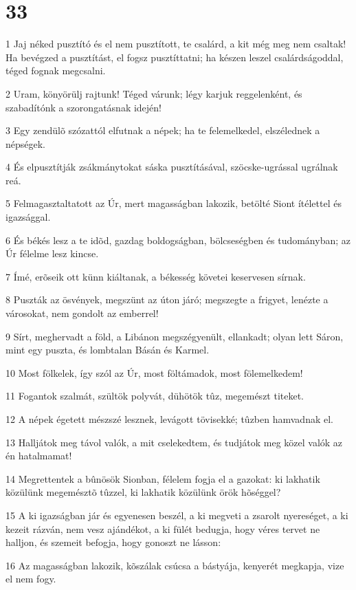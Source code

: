 \chapter{33}

\par 1 Jaj néked pusztító és el nem pusztított, te csalárd, a kit még meg nem csaltak! Ha bevégzed a pusztítást, el fogsz pusztíttatni; ha készen leszel csalárdságoddal, téged fognak megcsalni.
\par 2 Uram, könyörülj rajtunk! Téged várunk; légy karjuk reggelenként, és szabadítónk a szorongatásnak idején!
\par 3 Egy zendülõ szózattól elfutnak a népek; ha te felemelkedel, elszélednek a népségek.
\par 4 És elpusztítják zsákmánytokat sáska pusztításával, szöcske-ugrással ugrálnak reá.
\par 5 Felmagasztaltatott az Úr, mert magasságban lakozik, betölté Siont ítélettel és igazsággal.
\par 6 És békés lesz a te idõd, gazdag boldogságban, bölcseségben és tudományban; az Úr félelme lesz kincse.
\par 7 Ímé, erõseik ott künn kiáltanak, a békesség követei keservesen sírnak.
\par 8 Puszták az ösvények, megszünt az úton járó; megszegte a frigyet, lenézte a városokat, nem gondolt az emberrel!
\par 9 Sírt, meghervadt a föld, a Libánon megszégyenült, ellankadt; olyan lett Sáron, mint egy puszta, és lombtalan Básán és Karmel.
\par 10 Most fölkelek, így szól az Úr, most föltámadok, most fölemelkedem!
\par 11 Fogantok szalmát, szültök polyvát, dühötök tûz, megemészt titeket.
\par 12 A népek égetett mészszé lesznek, levágott tövisekké; tûzben hamvadnak el.
\par 13 Halljátok meg távol valók, a mit cselekedtem, és tudjátok meg közel valók az én hatalmamat!
\par 14 Megrettentek a bûnösök Sionban, félelem fogja el a gazokat: ki lakhatik közülünk megemésztõ tûzzel, ki lakhatik közülünk örök hõséggel?
\par 15 A ki igazságban jár és egyenesen beszél, a ki megveti a zsarolt nyereséget, a ki kezeit rázván, nem vesz ajándékot, a ki fülét bedugja, hogy véres tervet ne halljon, és szemeit befogja, hogy gonoszt ne lásson:
\par 16 Az magasságban lakozik, kõszálak csúcsa a bástyája, kenyerét megkapja, vize el nem fogy.
